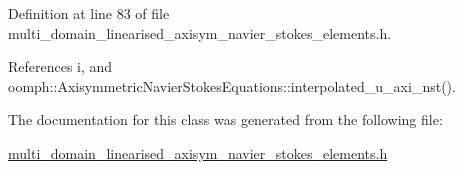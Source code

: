 Definition at line 83 of file multi\+\_\+domain\+\_\+linearised\+\_\+axisym\+\_\+navier\+\_\+stokes\+\_\+elements.\+h.



References i, and oomph\+::\+Axisymmetric\+Navier\+Stokes\+Equations\+::interpolated\+\_\+u\+\_\+axi\+\_\+nst().



The documentation for this class was generated from the following file\+:\begin{DoxyCompactItemize}
\item 
\hyperlink{multi__domain__linearised__axisym__navier__stokes__elements_8h}{multi\+\_\+domain\+\_\+linearised\+\_\+axisym\+\_\+navier\+\_\+stokes\+\_\+elements.\+h}\end{DoxyCompactItemize}

